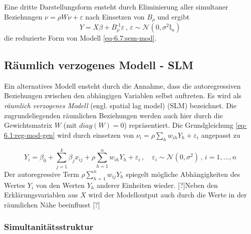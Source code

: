 Eine dritte Darstellungsform ensteht durch Eliminierung 
aller simultaner Beziehungen $\nu=\rho W \nu + \varepsilon$ 
nach Einsetzen von $B_{\rho}$ und ergibt 
\begin{equation}
    Y=X \beta + B_{\rho}^{\text{-1}} \varepsilon \, , \, 
    \varepsilon \sim \mathcal{N}(0,\sigma^{2} \mathds{I}_{n})
\end{equation}
die reduzierte Form von Modell \eqref{eq-6.7:sem-mod}. 


\subsection{Räumlich verzogenes Modell - SLM}
Ein alternatives Modell ensteht durch die Annahme, 
dass die autoregressiven Beziehungen zwischen den abhängigen Variablen 
selbst auftreten. Es wird als \emph{räumlich verzogenes Modell} 
(engl. spatial lag model) (SLM) bezeichnet. Die zugrundeliegenden räumlichen Beziehungen werden auch hier 
durch die Gewichtsmatrix $W$ (mit $diag(W)=0$) repräsentiert. Die Grundgleichung \eqref{eq-6.1:reg-mod-gen}
wird durch einsetzen von $\nu_{i}=\rho \sum_{h} w_{ih}Y_{h}+\varepsilon_{i}$ angepasst zu 

\begin{equation} \label{eq-6.9:slm-mod}
    Y_i = \beta_{0} + \sum_{j=1}^{k} 
    \beta_{j} x_{ij} + \rho \sum_{h=1}^{n} w_{ih}Y_{h} + \varepsilon_{i} \, , \quad
    \varepsilon_{i} \sim \mathcal{N}(0,\sigma^{2}) \, , \, i=1,\ldots,n
\end{equation}
Der autoregressive Term $\rho \sum_{h=1}^{n} w_{ij} Y_{h}$ spiegelt mögliche 
Abhängigkeiten des Wertes $Y_{i}$ von den Werten $Y_{h}$ anderer Einheiten wieder.
[?]Neben den Erklärungsvariablen aus $X$ wird der Modelloutput auch durch die
Werte in der räumlichen Nähe beeinflusst [?]

\subsubsection{Simultanitätsstruktur}

